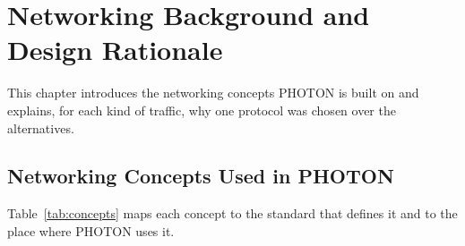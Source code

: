 \section{Networking Background and Design Rationale}\label{sec:background}

This chapter introduces the networking concepts PHOTON is built on and explains, for each kind of traffic, why one protocol was chosen over the alternatives.

\subsection{Networking Concepts Used in PHOTON}

Table~\ref{tab:concepts} maps each concept to the standard that defines it and to the place where PHOTON uses it.

